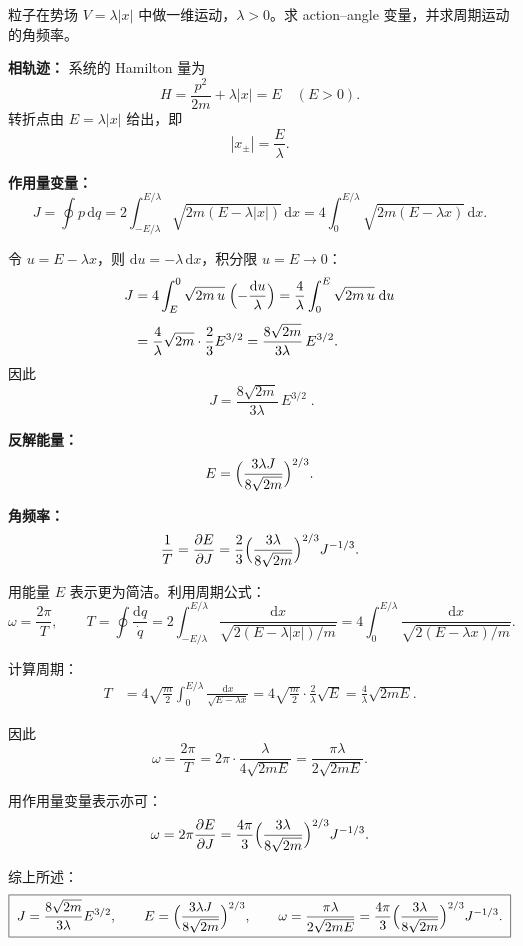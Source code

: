 \begin{question}
粒子在势场 \(V=\lambda|x|\) 中做一维运动，\(\lambda>0\)。求 action--angle 变量，并求周期运动的角频率。

\begin{solution}
\noindent\textbf{相轨迹：} 系统的 Hamilton 量为
\[
H=\frac{p^2}{2m}+\lambda|x|=E\quad(E>0).
\]
转折点由 \(E=\lambda|x|\) 给出，即
\[
|x_{\pm}|=\frac{E}{\lambda}.
\]

\noindent\textbf{作用量变量：}
\[
J=\oint p\,\mathrm dq
=2\int_{-E/\lambda}^{E/\lambda}\sqrt{2m(E-\lambda|x|)}\,\mathrm dx
=4\int_{0}^{E/\lambda}\sqrt{2m(E-\lambda x)}\,\mathrm dx .
\]

令 \(u=E-\lambda x\)，则 \(\mathrm du=-\lambda\,\mathrm dx\)，积分限 \(u=E\to0\)：
\[
\begin{aligned}
J&=4\int_{E}^{0}\sqrt{2m\,u}\;\Bigl(-\frac{\mathrm du}{\lambda}\Bigr)
=\frac{4}{\lambda}\int_{0}^{E}\sqrt{2m\,u}\;\mathrm du \\[4pt]
&=\frac{4}{\lambda}\sqrt{2m}\cdot\frac{2}{3}E^{3/2}
=\frac{8\sqrt{2m}}{3\lambda}\,E^{3/2}.
\end{aligned}
\]
因此
\[
\boxed{\;J=\frac{8\sqrt{2m}}{3\lambda}\,E^{3/2}\;}.
\]

\noindent\textbf{反解能量：}
\[
E=\Bigl(\frac{3\lambda J}{8\sqrt{2m}}\Bigr)^{2/3}.
\]

\noindent\textbf{角频率：}
\[
\frac{1}{T}=\frac{\partial E}{\partial J}
=\frac{2}{3}\Bigl(\frac{3\lambda}{8\sqrt{2m}}\Bigr)^{2/3}J^{-1/3}.
\]

用能量 \(E\) 表示更为简洁。利用周期公式：
\[
\omega=\frac{2\pi}{T},\qquad
T=\oint\frac{\mathrm dq}{\dot q}
=2\int_{-E/\lambda}^{E/\lambda}\frac{\mathrm dx}{\sqrt{2(E-\lambda|x|)/m}}
=4\int_0^{E/\lambda}\frac{\mathrm dx}{\sqrt{2(E-\lambda x)/m}} .
\]

计算周期：
\[
\begin{aligned}
T&=4\sqrt{\frac{m}{2}}\int_0^{E/\lambda}\frac{\mathrm dx}{\sqrt{E-\lambda x}}
=4\sqrt{\frac{m}{2}}\cdot\frac{2}{\lambda}\sqrt{E}
=\frac{4}{\lambda}\sqrt{2mE}.
\end{aligned}
\]

因此
\[
\omega=\frac{2\pi}{T}=2\pi\cdot\frac{\lambda}{4\sqrt{2mE}}
=\frac{\pi\lambda}{2\sqrt{2mE}} .
\]

用作用量变量表示亦可：
\[
\omega=2\pi\frac{\partial E}{\partial J}
=\frac{4\pi}{3}\Bigl(\frac{3\lambda}{8\sqrt{2m}}\Bigr)^{2/3}J^{-1/3}.
\]

综上所述：
\[
\boxed{\;
J=\frac{8\sqrt{2m}}{3\lambda}E^{3/2},\qquad
E=\Bigl(\frac{3\lambda J}{8\sqrt{2m}}\Bigr)^{2/3},\qquad
\omega=\frac{\pi\lambda}{2\sqrt{2mE}}
=\frac{4\pi}{3}\Bigl(\frac{3\lambda}{8\sqrt{2m}}\Bigr)^{2/3}J^{-1/3}.
\;}
\]

\end{solution}
\end{question}


